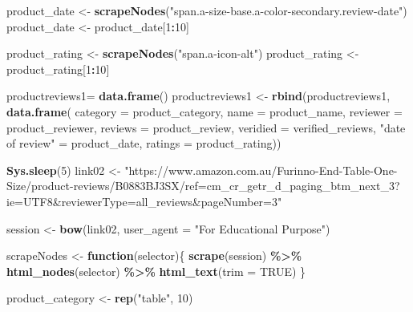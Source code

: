 \documentclass[
]{article}
\newenvironment{Shaded}{\begin{snugshade}}{\end{snugshade}}
\newcommand{\AttributeTok}[1]{\textcolor[rgb]{0.13,0.29,0.53}{#1}}
\newcommand{\ConstantTok}[1]{\textcolor[rgb]{0.56,0.35,0.01}{#1}}
\newcommand{\ControlFlowTok}[1]{\textcolor[rgb]{0.13,0.29,0.53}{\textbf{#1}}}
\newcommand{\DecValTok}[1]{\textcolor[rgb]{0.00,0.00,0.81}{#1}}
\newcommand{\FunctionTok}[1]{\textcolor[rgb]{0.13,0.29,0.53}{\textbf{#1}}}
\newcommand{\NormalTok}[1]{#1}
\newcommand{\OtherTok}[1]{\textcolor[rgb]{0.56,0.35,0.01}{#1}}
\newcommand{\SpecialCharTok}[1]{\textcolor[rgb]{0.81,0.36,0.00}{\textbf{#1}}}
\newcommand{\StringTok}[1]{\textcolor[rgb]{0.31,0.60,0.02}{#1}}
\begin{document}
\begin{Shaded}
\begin{Highlighting}[]
\NormalTok{  product\_date }\OtherTok{\textless{}{-}} \FunctionTok{scrapeNodes}\NormalTok{(}\StringTok{"span.a{-}size{-}base.a{-}color{-}secondary.review{-}date"}\NormalTok{)}
\NormalTok{  product\_date }\OtherTok{\textless{}{-}}\NormalTok{ product\_date[}\DecValTok{1}\SpecialCharTok{:}\DecValTok{10}\NormalTok{]}
  
\NormalTok{  product\_rating }\OtherTok{\textless{}{-}} \FunctionTok{scrapeNodes}\NormalTok{(}\StringTok{"span.a{-}icon{-}alt"}\NormalTok{)}
\NormalTok{  product\_rating }\OtherTok{\textless{}{-}}\NormalTok{ product\_rating[}\DecValTok{1}\SpecialCharTok{:}\DecValTok{10}\NormalTok{]}
  
\NormalTok{  productreviews1}\OtherTok{=} \FunctionTok{data.frame}\NormalTok{()}
\NormalTok{  productreviews1 }\OtherTok{\textless{}{-}} \FunctionTok{rbind}\NormalTok{(productreviews1, }\FunctionTok{data.frame}\NormalTok{(}
                      \AttributeTok{category =}\NormalTok{ product\_category,}
                      \AttributeTok{name =}\NormalTok{ product\_name,}
                      \AttributeTok{reviewer =}\NormalTok{ product\_reviewer,}
                      \AttributeTok{reviews =}\NormalTok{ product\_review,}
                      \AttributeTok{veridied =}\NormalTok{ verified\_reviews,}
                      \StringTok{"date of review"} \OtherTok{=}\NormalTok{ product\_date,}
                      \AttributeTok{ratings =}\NormalTok{ product\_rating))}

  
 \FunctionTok{Sys.sleep}\NormalTok{(}\DecValTok{5}\NormalTok{)}
\NormalTok{link02 }\OtherTok{\textless{}{-}} \StringTok{"https://www.amazon.com.au/Furinno{-}End{-}Table{-}One{-}Size/product{-}reviews/B0883BJ3SX/ref=cm\_cr\_getr\_d\_paging\_btm\_next\_3?ie=UTF8\&reviewerType=all\_reviews\&pageNumber=3"}


\NormalTok{  session }\OtherTok{\textless{}{-}} \FunctionTok{bow}\NormalTok{(link02,}
               \AttributeTok{user\_agent =} \StringTok{"For Educational Purpose"}\NormalTok{)}

\NormalTok{  scrapeNodes }\OtherTok{\textless{}{-}} \ControlFlowTok{function}\NormalTok{(selector)\{}
    \FunctionTok{scrape}\NormalTok{(session) }\SpecialCharTok{\%\textgreater{}\%}
      \FunctionTok{html\_nodes}\NormalTok{(selector) }\SpecialCharTok{\%\textgreater{}\%}
      \FunctionTok{html\_text}\NormalTok{(}\AttributeTok{trim =} \ConstantTok{TRUE}\NormalTok{)}
\NormalTok{  \}}

\NormalTok{  product\_category }\OtherTok{\textless{}{-}} \FunctionTok{rep}\NormalTok{(}\StringTok{"table"}\NormalTok{, }\DecValTok{10}\NormalTok{)}


\end{Highlighting}
\end{Shaded}
\end{document}
